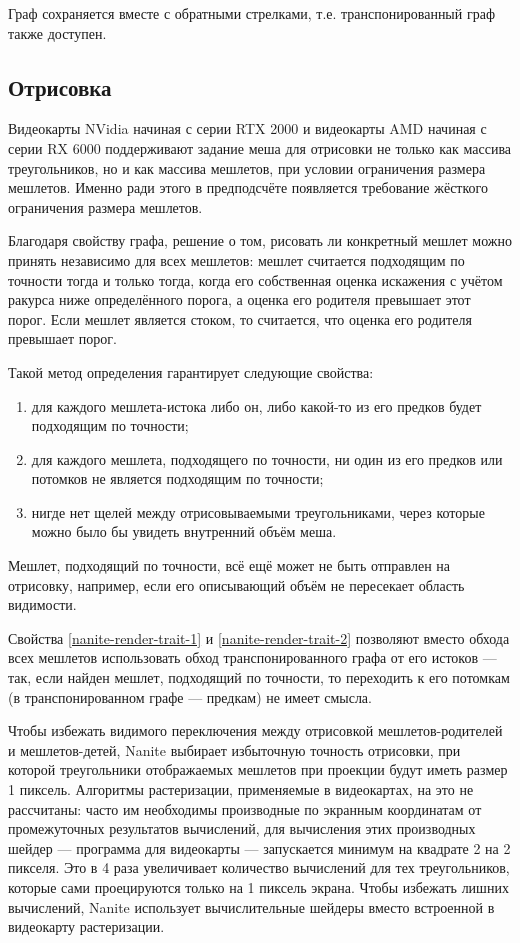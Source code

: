 Граф сохраняется вместе с обратными стрелками, т.е. транспонированный граф также доступен.

\subsection*{Отрисовка}
Видеокарты NVidia начиная с серии RTX 2000 и видеокарты AMD начиная с серии RX 6000 поддерживают задание меша для отрисовки не только как массива треугольников, но и как массива мешлетов, при условии ограничения размера мешлетов.
Именно ради этого в предподсчёте появляется требование жёсткого ограничения размера мешлетов.

Благодаря свойству графа, решение о том, рисовать ли конкретный мешлет можно принять независимо для всех мешлетов: мешлет считается подходящим по точности тогда и только тогда, когда его собственная оценка искажения с учётом ракурса ниже определённого порога, а оценка его родителя превышает этот порог.
Если мешлет является стоком, то считается, что оценка его родителя превышает порог.

Такой метод определения гарантирует следующие свойства:
\begin{enumerate}
    \item для каждого мешлета-истока либо он, либо какой-то из его предков будет подходящим по точности;
    \label{nanite-render-trait-1}
    \item для каждого мешлета, подходящего по точности, ни один из его предков или потомков не является подходящим по точности;
    \label{nanite-render-trait-2}
    \item нигде нет щелей между отрисовываемыми треугольниками, через которые можно было бы увидеть внутренний объём меша.
\end{enumerate}

Мешлет, подходящий по точности, всё ещё может не быть отправлен на отрисовку, например, если его описывающий объём не пересекает область видимости.

Свойства \ref{nanite-render-trait-1} и \ref{nanite-render-trait-2} позволяют вместо обхода всех мешлетов использовать обход транспонированного графа от его истоков --- так, если найден мешлет, подходящий по точности, то переходить к его потомкам (в транспонированном графе --- предкам) не имеет смысла.

Чтобы избежать видимого переключения между отрисовкой мешлетов-родителей и мешлетов-детей, Nanite выбирает избыточную точность отрисовки, при которой треугольники отображаемых мешлетов при проекции будут иметь размер 1 пиксель.
Алгоритмы растеризации, применяемые в видеокартах, на это не рассчитаны: часто им необходимы производные по экранным координатам от промежуточных результатов вычислений, для вычисления этих производных шейдер --- программа для видеокарты --- запускается минимум на квадрате 2 на 2 пикселя.
Это в 4 раза увеличивает количество вычислений для тех треугольников, которые сами проецируются только на 1 пиксель экрана.
Чтобы избежать лишних вычислений, Nanite использует вычислительные шейдеры вместо встроенной в видеокарту растеризации.
